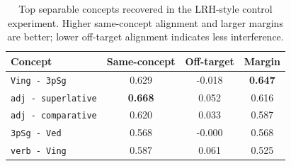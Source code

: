 \begin{table}[t]
    \centering
    \caption{Top separable concepts recovered in the LRH-style control experiment. Higher same-concept alignment and larger margins are better; lower off-target alignment indicates less interference.}
    \label{tab:control}
    \begin{tabular}{@{}lccc@{}}
        \toprule
        Concept & Same-concept & Off-target & Margin \\
        \midrule
        \texttt{Ving - 3pSg} & 0.629 & -0.018 & {\bf 0.647} \\
        \texttt{adj - superlative} & {\bf 0.668} & 0.052 & 0.616 \\
        \texttt{adj - comparative} & 0.620 & 0.033 & 0.587 \\
        \texttt{3pSg - Ved} & 0.568 & -0.000 & 0.568 \\
        \texttt{verb - Ving} & 0.587 & 0.061 & 0.525 \\
        \bottomrule
    \end{tabular}
\end{table}
